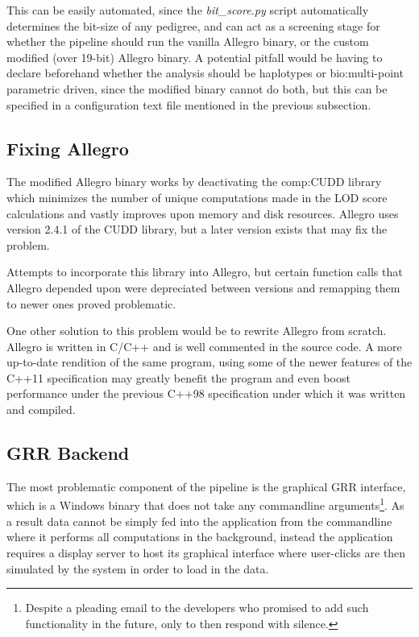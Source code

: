 This can be easily automated, since the \textit{bit\_score.py} script automatically determines the bit-size of any pedigree, and can act as a screening stage for whether the pipeline should run the vanilla Allegro binary, or the custom modified (over 19-bit) Allegro binary. A potential pitfall would be having to declare beforehand whether the analysis should be haplotypes or \gls{bio:multi-point parametric} driven, since the modified binary cannot do both, but this can be specified in a configuration text file mentioned in the previous subsection.

\subsection{Fixing Allegro}

The modified Allegro binary works by deactivating the \gls{comp:CUDD} library which minimizes the number of unique computations made in the LOD score calculations and vastly improves upon memory and disk resources. Allegro uses version 2.4.1 of the CUDD library, but a later version exists that may fix the problem.

Attempts to incorporate this library into Allegro, but certain function calls that Allegro depended upon were depreciated between versions and remapping them to newer ones proved problematic. 

One other solution to this problem would be to rewrite Allegro from scratch. Allegro is written in C/C++ and is well commented in the source code. A more up-to-date rendition of the same program, using some of the newer features of the C++11 specification \cite{c++2011iso} may greatly benefit the program and even boost performance under the previous C++98 specification under which it was written and compiled.

\subsection{GRR Backend}

The most problematic component of the pipeline is the graphical GRR interface, which is a Windows binary that does not take any commandline arguments\footnote{Despite a pleading email to the developers who promised to add such functionality in the future, only to then respond with silence.}. As a result data cannot be simply fed into the application from the commandline where it performs all computations in the background, instead the application requires a display server to host its graphical interface where user-clicks are then simulated by the system in order to load in the data.


